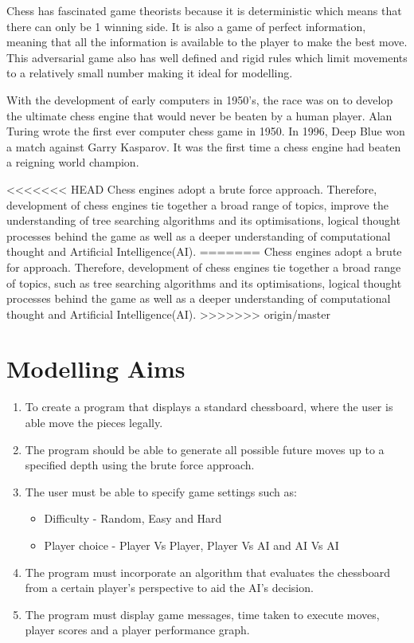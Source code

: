 \documentclass[11pt,a4paper]{article}
\begin{document}
Chess has fascinated game theorists because it is deterministic which means that there can only be 1 winning side. It is also a game of perfect information, meaning that all the information is available to the player to make the best move. This adversarial game also has well defined and rigid rules which limit movements to a relatively small number making it ideal for modelling.\cite{chess1}
 
With the development of early computers in 1950’s, the race was on to develop the ultimate chess engine that would never be beaten by a human player. Alan Turing wrote the first ever computer chess game in 1950. In 1996, Deep Blue won a match against Garry Kasparov. It was the first time a chess engine had beaten a reigning world champion.
 
<<<<<<< HEAD
Chess engines adopt a brute force approach. Therefore, development of chess engines tie together a broad range of topics, improve the understanding of tree searching algorithms and its optimisations, logical thought processes behind the game as well as a deeper understanding of computational thought and Artificial Intelligence(AI).
=======
Chess engines adopt a brute for approach. Therefore, development of chess engines tie together a broad range of topics, such as tree searching algorithms and its optimisations, logical thought processes behind the game as well as a deeper understanding of computational thought and Artificial Intelligence(AI).
>>>>>>> origin/master



\newpage
\section{Modelling Aims}

\begin{enumerate}
\item To create a program that displays a standard chessboard, where the user is able move the pieces legally.
\item The program should be able to generate all possible future moves up to a specified depth using the brute force approach.
\item The user must be able to specify game settings such as: 

\begin{itemize}
\item Difficulty - Random, Easy and Hard
\item Player choice - Player Vs Player, Player Vs AI and AI Vs AI
\end{itemize}

\item The program must incorporate an algorithm that evaluates the chessboard from a certain player’s perspective to aid the AI’s decision.
\item The program must display game messages, time taken to execute moves, player scores and a player performance graph.
\end{enumerate}
\end{document}
